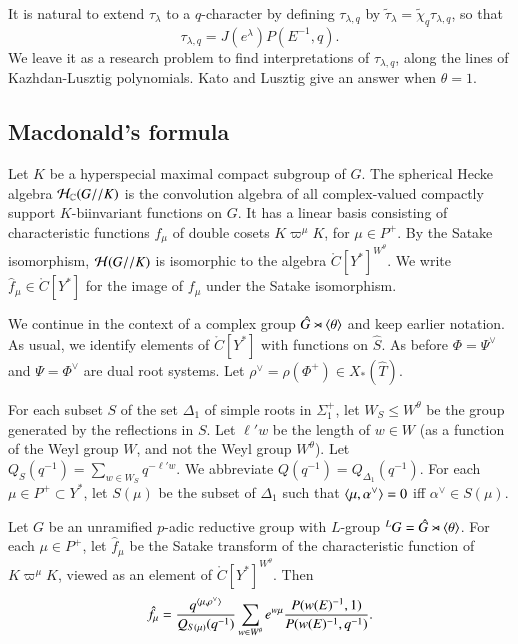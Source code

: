 It is natural to extend $\tau_\lambda$ to a $q$-character by defining $\tau_{\lambda,q}$ by
$\tilde \tau_\lambda = \tilde \chi_q\tau_{\lambda,q} $, so that
\begin{equation}
\tau_{\lambda,q} = J(e^\lambda) P(E^{-1},q).
\end{equation}
We leave it as a research problem to find interpretations of $\tau_{\lambda,q}$, along the lines of Kazhdan-Lusztig
polynomials.  Kato and Lusztig give an answer when $\theta=1$.


\subsection{Macdonald's formula}\label{sec:macdonald}



Let $K$ be a hyperspecial maximal compact subgroup of $G$.  The spherical Hecke
algebra $\mathcal H_{\mathbb{C}}(G//K)$ 
is the convolution algebra of all complex-valued compactly support $K$-biinvariant functions
on $G$.  It has a linear basis consisting of characteristic functions $f_\mu$ of double cosets
$K\varpi^\mu K$, for $\mu\in P^+$.    By the Satake isomorphism, $\mathcal H(G//K)$ is isomorphic
to the algebra $\ring{C}[Y^*]^{W^\theta}$.   We write $\hat f_\mu\in \ring{C}[Y^*]$ 
for the image of $f_\mu$
under the Satake isomorphism.

We continue in the context of a complex group $\hat G \rtimes \langle{\theta}\rangle$ and keep earlier notation.
As usual, we identify elements of $\ring{C}[Y^*]$ with functions on $\hat S$.  
As before $\Phi=\Psi^\vee$ and $\Psi = \Phi^\vee$ are dual root systems.
Let $\rho^\vee = \rho(\Phi^+)\in X_*(\hat T)$.


For each subset $S$
of the set $\Delta_1$ of simple  roots in $\Sigma^+_1$,
 let $W_S\le W^\theta$ be the group generated by the reflections in $S$.
Let $\ell' w$ be the length of $w\in W$ (as a function of the Weyl group $W$, and not the Weyl group $W^\theta$).
Let $Q_S(q^{-1}) = \sum_{w\in W_S} q^{-\ell'w}$.  We abbreviate $Q(q^{-1}) = Q_{\Delta_1}(q^{-1})$.
For each $\mu\in P^+\subset Y^*$, let $S(\mu)$ be the subset of $\Delta_1$ such that $\langle{\mu,\alpha^\vee}\rangle=0$ iff $\alpha^\vee\in S(\mu)$.

\begin{theorem}\label{thm:macdonald}
Let $G$ be an unramified $p$-adic reductive group with $L$-group ${}^LG = \hat G \rtimes \langle{\theta}\rangle$.
For each $\mu\in P^+$, 
let $\hat f_\mu$ be the Satake transform of the characteristic function of $K\varpi^\mu K$, viewed as an element
of $\ring{C}[Y^*]^{W^\theta}$.  Then
\[
\hat f_\mu = \frac{q^{\langle{\mu,\rho^\vee}\rangle}}{ Q_{S(\mu)}(q^{-1})} \sum_{w\in W^\theta} e^{w\mu} \frac{P(w(E)^{-1},1)}{P(w(E)^{-1},q^{-1})}.
\]
\end{theorem}


